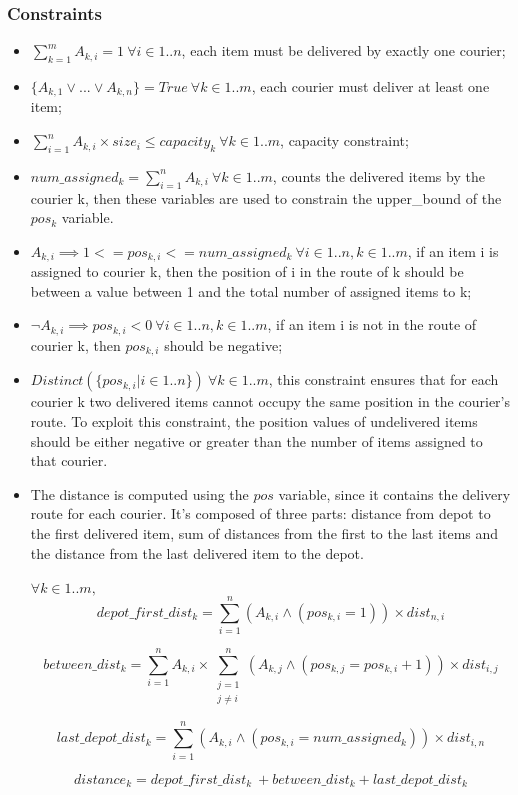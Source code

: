 \documentclass{article}
\begin{document}
\subsubsection{Constraints}
\begin{itemize}
    \item
    $\sum_{k=1}^{m} A_{k,i} = 1 \: \forall i \in 1..n$, each item must be delivered by exactly one courier;
    \item
    $\{A_{k,1}\lor ... \lor A_{k,n}\} = True \: \forall k \in 1..m$, each courier must deliver at least one item;
    \item
    $\sum_{i=1}^{n} A_{k,i} \times size_{i} \leq capacity_{k} \: \forall k \in 1..m$, capacity constraint;
    \item
    $num\_assigned_{k}= \sum_{i=1}^{n}A_{k,i} \: \forall k \in 1..m$, counts the delivered items by the courier k, then these variables are used to constrain the upper\_bound of the $pos_{k}$ variable. 
    \item
    $A_{k,i} \implies 1<=pos_{k,i}<=num\_assigned_{k} \:\forall i \in 1..n, k \in 1..m $, if an item i is assigned to courier k, then the position of i in the route of k should be between a value between 1 and the total number of assigned items to k;
    \item 
    $\neg A_{k,i} \implies pos_{k,i}<0 \:\forall i \in 1..n, k \in 1..m $, if an item i is not in the route of courier k, then $pos_{k,i}$ should be negative;
    \item 
        $Distinct(\{pos_{k,i} | i \in 1..n\}) \: \forall k \in 1..m$, this constraint ensures that for each courier k two delivered items cannot occupy the same position in the courier's route. To exploit this constraint, the position values of undelivered items should be either negative or greater than the number of items assigned to that courier.
    \item
        The distance is computed using the $pos$ variable, since it contains the delivery route for each courier. It's composed of three parts: distance from depot to the first delivered item, sum of distances from the first to the last items and the distance from the last delivered item to the depot. \\
    \\
    $\forall k \in 1..m,$
    \[depot\_first\_dist_{k} = \sum_{i=1}^{n}(A_{k,i} \land (pos_{k,i} = 1)) \times dist_{n,i}\]

    \[between\_dist_{k} = \sum_{i=1}^{n} A_{k,i}\times \sum_{\begin{array}{c} {j=1} \\ j \ne i\end{array}}^{n} (A_{k,j}\land (pos_{k,j} = pos_{k,i} + 1)) \times dist_{i,j}\]
    
    \[last\_depot\_dist_{k} = \sum_{i=1}^{n}(A_{k,i} \land (pos_{k,i} = num\_assigned_k)) \times dist_{i,n}\]
  
    \[distance_k = depot\_first\_dist_{k}\ + between\_dist_{k} + last\_depot\_dist_{k}\]
\end{itemize}
\end{document}
